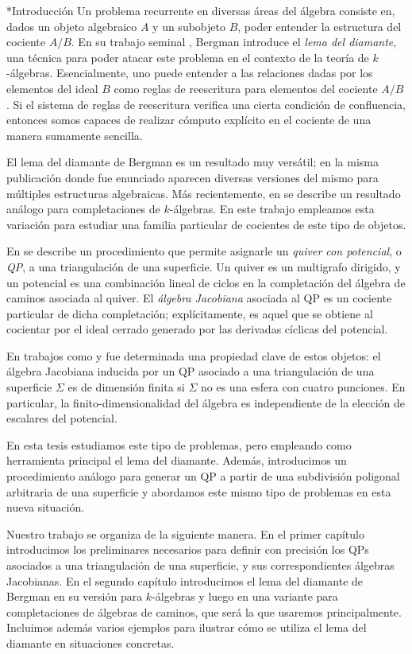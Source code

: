 \begin{chapter}*{Introducción}
Un problema recurrente en diversas áreas del álgebra consiste en, dados un objeto algebraico $A$ y un subobjeto $B$, poder entender la estructura del cociente $A/B$. En su trabajo seminal \cite{Ber78}, Bergman introduce el \emph{lema del diamante}, una técnica para poder atacar este problema en el contexto de la teoría de $k$-álgebras. Esencialmente, uno puede entender a las relaciones dadas por los elementos del ideal $B$ como reglas de reescritura para elementos del cociente $A/B$. Si el sistema de reglas de reescritura verifica una cierta condición de confluencia, entonces somos capaces de realizar cómputo explícito en el cociente de una manera sumamente sencilla.

El lema del diamante de Bergman es un resultado muy versátil; en la misma publicación donde fue enunciado aparecen diversas versiones del mismo para múltiples estructuras algebraicas. Más recientemente, en \cite{SAV15} se describe un resultado análogo para completaciones de $k$-álgebras. En este trabajo empleamos esta variación para estudiar una familia particular de cocientes de este tipo de objetos.

En \cite{DWZ08} se describe un procedimiento que permite asignarle un \emph{quiver con potencial}, o \emph{QP}, a una triangulación de una superficie. Un quiver es un multigrafo dirigido, y un potencial es una combinación lineal de ciclos en la completación del álgebra de caminos asociada al quiver. El \emph{álgebra Jacobiana} asociada al QP es un cociente particular de dicha completación; explícitamente, es aquel que se obtiene al cocientar por el ideal cerrado generado por las derivadas cíclicas del potencial.

En trabajos como \cite{Lad12} y \cite{TVD12} fue determinada una propiedad clave de estos objetos: el álgebra Jacobiana inducida por un QP asociado a una triangulación de una superficie $\Sigma$ es de dimensión finita si $\Sigma$ no es una esfera con cuatro punciones. En particular, la finito-dimensionalidad del álgebra es independiente de la elección de escalares del potencial.

En esta tesis estudiamos este tipo de problemas, pero empleando como herramienta principal el lema del diamante. Además, introducimos un procedimiento análogo para generar un QP a partir de una subdivisión poligonal arbitraria de una superficie y abordamos este mismo tipo de problemas en esta nueva situación.

Nuestro trabajo se organiza de la siguiente manera. En el primer capítulo introducimos los preliminares necesarios para definir con precisión los QPs asociados a una triangulación de una superficie, y sus correspondientes álgebras Jacobianas. En el segundo capítulo introducimos el lema del diamante de Bergman en su versión para $k$-álgebras y luego en una variante para completaciones de álgebras de caminos, que será la que usaremos principalmente. Incluimos además varios ejemplos para ilustrar cómo se utiliza el lema del diamante en situaciones concretas.


\end{chapter}

